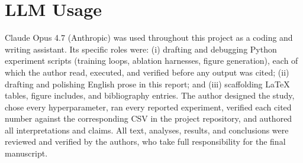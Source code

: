 \documentclass{article}
\begin{document}
\section*{LLM Usage}
Claude Opus 4.7 (Anthropic) was used throughout this project as a
coding and writing assistant. Its specific roles were: (i) drafting and
debugging Python experiment scripts (training loops, ablation harnesses,
figure generation), each of which the author read, executed, and
verified before any output was cited; (ii) drafting and polishing
English prose in this report; and (iii) scaffolding LaTeX tables, figure
includes, and bibliography entries. The author designed the study,
chose every hyperparameter, ran every reported experiment, verified
each cited number against the corresponding CSV in the project
repository, and authored all interpretations and claims. All text, analyses, results, and conclusions were reviewed and verified by the authors, who take full responsibility for the final manuscript.
\end{document}
